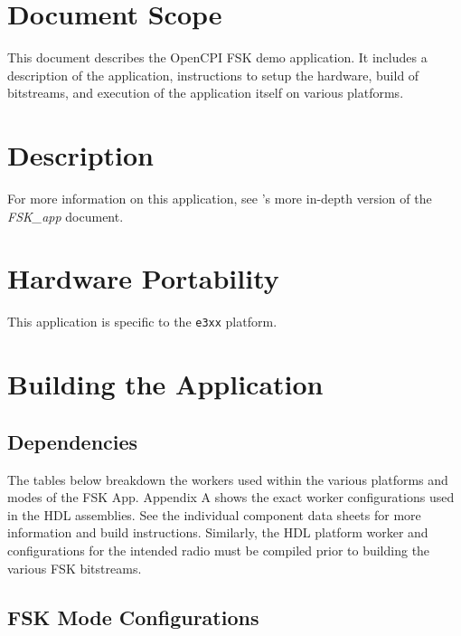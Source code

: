 \newpage
\tableofcontents
\pagebreak
\def\assetsdoc{\noindent For more information on this application, see \code{ocpi.assets}'s more in-depth version of the \textit{FSK\_app} document.}
\section{Document Scope}
This document describes the OpenCPI FSK demo application. It includes a description of the application, instructions to setup the hardware, build of bitstreams, and execution of the application itself on various platforms.

\section{Description}
\assetsdoc

\section{Hardware Portability}
This application is specific to the \verb+e3xx+ platform.

\section{Building the Application}
\subsection{Dependencies}
\noindent The tables below breakdown the workers used within the various platforms and modes of the FSK App. Appendix A shows the exact worker configurations used in the HDL assemblies. See the individual component data sheets for more information and build instructions. Similarly, the HDL platform worker and configurations for the intended radio must be compiled prior to building the various FSK bitstreams.
\subsection{FSK Mode Configurations}
